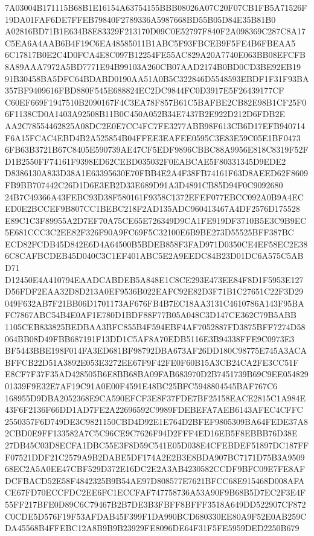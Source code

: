\documentclass[UTF8,fontset=fandol,zihao=-4,a4paper]{ctexart}
\begin{document}
{{7A03004B171115B68B1E16154A63754155BBB08026A07C20F07CB1FB5A71526F19DA01FAF6DE7FFEB79840F2789336A5987668BD55B05D84E35B81B0
A02816BD71B1E634B8E83329F213170D09C0E52797F840F2A098369C287C8A17C5EA6A4AAB6B4F19C6EA48585011B1ABC5F93FBCEB9F5FE4B6FBEAA5
6C17817B0E2C4D0FCA4E8C097B12254FE55AC829A20A7740E063BB08EFCFB8A89AAA7972A5BD7771E94B99103A260CB07AAD2174B0BD0CD3BE92EB19
91B30458BA5DFC64BDABD0190AA51A0B5C322846D5548593EBDF1F31F93BA357BF9409616FBD880F545E688824EC2DC9844FC0D3917E5F26439177CF
C60EF669F1947510B2090167F4C3EA78F857B61C5BAFBE2CB82E98B1CF25F06F1138CD0A1403A92508B11B0C450A052B34E7437B2E922D212D6FDB2E
AA2C78554462825A08DC2E0E7CC4FC7FE3277ABB98F613CB6D17EFB940714F6A15FCAC4EBD4B2A525854B04FFEE3EAFEE0595C3E83E59C05E1BF0473
6FB63B3721B67C8405E590739AE47CF5EDF9896CBBC88A9956E818C8319F52FD1B2550FF74161F9398ED62CEBD035032F0EABCAE5F80331345D9EDE2
D8386130A833D38A1E63395630E70FBB4E2A4F38FB74161F63D8AEED62F8609FB9BB707442C26D1D6E3EB2D33E689D91A3D4891CB85D94F0C9092680
24B7C49366A43FEBC93D38F580161F9358C1372EFEF077EBCC092A0B9A4ECED0E2BCCEF9B807CC1BEBC218F2AD135ADC960413467A4DF2576D175528
E89C1C3F89955A2D7EF70A75CE65E726349D9CA1FE919DF3710B5E3C9B9EC5E681CCC3C2EE82F326F90A9FC69F5C32100E6B9BE273D55525BFF387BC
ECD82FCDB45D842E6D4A64500B5BDEB858F3FAD971D0350CE4EF58EC2E386C8CAFBCDEB45D040C3C1EF401ABC5E2A9EEDC84B23D01DC6A575C5ABD71
D12450E4A410794EAADCABDEB5A848E1C8CE293E473EE84F8D1F5953E127D56FDF2EAA32D8D213A0EF9536B022EAFC92E82D3F71B1C27651C22F3D29
049F632AB7F21BB06D1701173AF676FB4B7EC18AA3131C4610786A143F95BAFC7867ABC54B4E0AF1E780D1BDF88F77B05A048C3D147CE362C79B5ABB
1105CEB833825BEDBAA3BFC855B4F594EBF4AF7052887FD3875BFF7274D58064BB08D49FBB687191F13DD1C5AF8A70EDB5116E3B94338FFE9C0973E3
BF5443BBE198F014FA3ED681BF98792DBA673AF26DD180C98775E745A3ACABFFCB22D51A3892E053E3272EE67F9F42FE0F60B15A3CB24CA2FE3CC51F
E8CF7F37F35AD428505B6E8BB68BA09FAB683970D2B7451739B69C9EE05482901339F9E32E7AF19C91A0E00F4591E48BC25BFC5948804545BAF767C6
168955D9DBA2052368E9CA590EFCF3E8F37FDE7BF25158EACE2815C1A984E43F6F2136F66DD1AD7FE2A22696592C9989FDEBEFA7AEB6143AFEC4CFFC
2550357F6D749DE3C9821150CBD4D92E1E764D2BFEF9805309BA64FEDE37A82CBD0E9FF133582A7C5C96CE9C7626F94D2FFF4ED16EB5F8EBBB76D38E
27DB45C03D8ECFA1DBC55E3F8D59C541E05D038E4CFEBDEF51897DC187FFF07521DDF21C2579A9B2DABE5DF174A2E2B3E8BDA907BC7171D75B3A9509
68EC2A5A0EE47CBF529D372E16DC2E2A3AB4230582CCDF9BFC09E7FE8AFDCFBACD52E58F4842325B9B54AE97D808577E7621BFCC68E915468D008AFA
CE67FD70ECCFDC2EE6FC1ECCFAF747758736A53A90F9B68B5D7EC2F3E4F55FF217BFE0D89C6C79467B2B7DE3B3FBFF8BFFF3518A649DD522907CF872
C0CDE5D576F19F53AFDAB45F399F1DA990BCD680330EE80A9F52E0AB259CDA45568B4FFEBC12A8B9B9B23929FE8096DE64F31F5FE5959DED2250B679
}}
\end{document}
